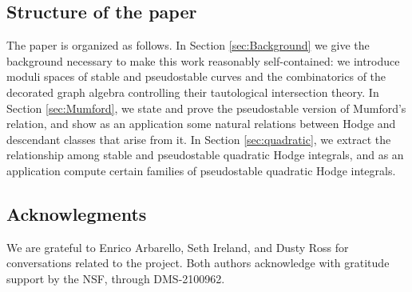 \documentclass[leqno,12pt]{amsart}
\theoremstyle{remark}
\numberwithin{equation}{section}
\begin{document}
\subsection{Structure of the paper} The paper is organized as follows. In Section \ref{sec:Background} we give the background necessary to make this work reasonably self-contained: we introduce moduli spaces of stable and pseudostable curves and the combinatorics of the decorated graph algebra controlling their tautological intersection theory.
In Section \ref{sec:Mumford}, we state and prove the pseudostable version of Mumford's relation, and show as an application some natural relations between Hodge and descendant classes that arise from it.
In Section \ref{sec:quadratic}, we extract the relationship among stable and pseudostable quadratic Hodge integrals, and as an application compute certain families of pseudostable quadratic Hodge integrals.
\subsection{Acknowlegments}
We are grateful to Enrico Arbarello, Seth Ireland, and Dusty Ross for conversations related to the project.
Both authors acknowledge with gratitude support by the NSF, through DMS-2100962.
\end{document}
